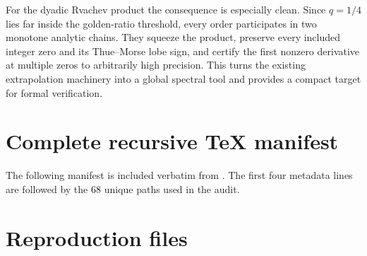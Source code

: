 \documentclass[11pt]{article}
\numberwithin{equation}{section}
\theoremstyle{definition}
\theoremstyle{remark}
\begin{document}
For the dyadic Rvachev product the consequence is especially clean.  Since $q=1/4$ lies far
inside the golden-ratio threshold, every order participates in two monotone analytic chains.
They squeeze the product, preserve every included integer zero and its Thue--Morse lobe sign,
and certify the first nonzero derivative at multiple zeros to arbitrarily high precision.
This turns the existing extrapolation machinery into a global spectral tool and provides a
compact target for formal verification.

\appendix
\renewcommand*{\theHsection}{\arabic{part}.\arabic{section}}

\section{Complete recursive TeX manifest}\label{p3:app:manifest}

The following manifest is included verbatim from
.  The first four metadata
lines are followed by the 68 unique paths used in the audit.



\section{Reproduction files}\label{p3:app:files}
\end{document}
